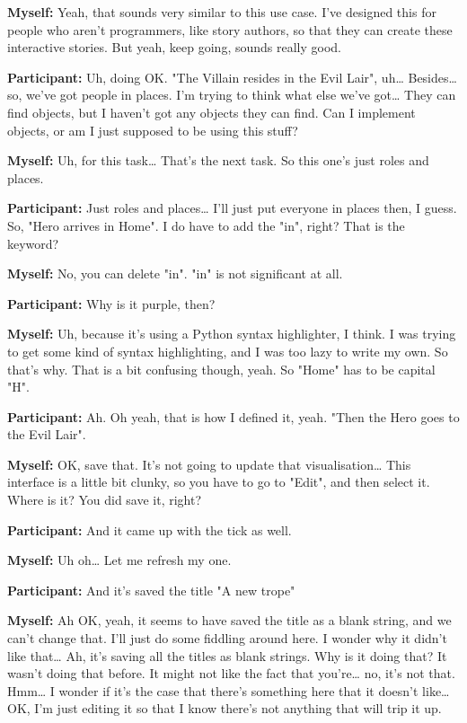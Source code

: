 \documentclass[11pt]{report}
\begin{document}
\begin{linenumbers}
\textbf{Myself:} Yeah, that sounds very similar to this use case. I've designed this for people who aren't programmers, like story authors, so that they can create these interactive stories. But yeah, keep going, sounds really good.

\textbf{Participant:} Uh, doing OK. "The Villain resides in the Evil Lair", uh\ldots{} Besides\ldots{} so, we've got people in places. I'm trying to think what else we've got\ldots{} They can find objects, but I haven't got any objects they can find. Can I implement objects, or am I just supposed to be using this stuff?

\textbf{Myself:} Uh, for this task\ldots{} That's the next task. So this one's just roles and places.

\textbf{Participant:} Just roles and places\ldots{} I'll just put everyone in places then, I guess. So, "Hero arrives in Home". I do have to add the "in", right? That is the keyword?

\textbf{Myself:} No, you can delete "in". "in" is not significant at all.

\textbf{Participant:} Why is it purple, then?

\textbf{Myself:} Uh, because it's using a Python syntax highlighter, I think. I was trying to get some kind of syntax highlighting, and I was too lazy to write my own. So that's why. That is a bit confusing though, yeah. So "Home" has to be capital "H".

\textbf{Participant:} Ah. Oh yeah, that is how I defined it, yeah. "Then the Hero goes to the Evil Lair".

\textbf{Myself:} OK, save that. It's not going to update that visualisation\ldots{} This interface is a little bit clunky, so you have to go to "Edit", and then select it. Where is it? You did save it, right?

\textbf{Participant:} And it came up with the tick as well.

\textbf{Myself:} Uh oh\ldots{} Let me refresh my one.

\textbf{Participant:} And it's saved the title "A new trope"

\textbf{Myself:} Ah OK, yeah, it seems to have saved the title as a blank string, and we can't change that. I'll just do some fiddling around here. I wonder why it didn't like that\ldots{} Ah, it's saving all the titles as blank strings. Why is it doing that? It wasn't doing that before. It might not like the fact that you're\ldots{} no, it's not that. Hmm\ldots{} I wonder if it's the case that there's something here that it doesn't like\ldots{} OK, I'm just editing it so that I know there's not anything that will trip it up.


\end{linenumbers}
\end{document}
